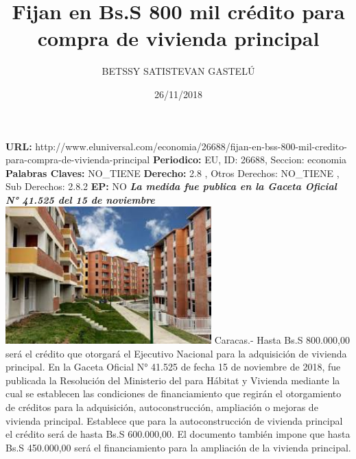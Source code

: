 \documentclass{article}%
\title{\textbf{Fijan en Bs.S 800 mil crédito para compra de vivienda principal}}%
\author{BETSSY SATISTEVAN GASTELÚ}%
\date{26/11/2018}%
\begin{document}
%
\normalsize%
\maketitle%
\textbf{URL: }%
http://www.eluniversal.com/economia/26688/fijan{-}en{-}bss{-}800{-}mil{-}credito{-}para{-}compra{-}de{-}vivienda{-}principal\newline%
%
\textbf{Periodico: }%
EU, %
ID: %
26688, %
Seccion: %
economia\newline%
%
\textbf{Palabras Claves: }%
NO\_TIENE\newline%
%
\textbf{Derecho: }%
2.8%
, Otros Derechos: %
NO\_TIENE%
, Sub Derechos: %
2.8.2%
\newline%
%
\textbf{EP: }%
NO\newline%
\newline%
%
\textbf{\textit{La medida fue publica en la Gaceta Oficial N° 41.525 del 15 de noviembre}}%
\newline%
\newline%
%
\includegraphics[width=300px]{218.jpg}%
\newline%
%
Caracas.{-} Hasta Bs.S 800.000,00 será el  crédito que otorgará el Ejecutivo Nacional para la adquisición de vivienda principal.\newline%
\newline%
En la Gaceta Oficial N° 41.525 de fecha 15 de noviembre de 2018, fue publicada la Resolución del Ministerio del para Hábitat y Vivienda mediante la cual se establecen las condiciones de financiamiento que regirán el otorgamiento de créditos para la adquisición, autoconstrucción, ampliación o mejoras de vivienda principal.\newline%
\newline%
Establece que para la autoconstrucción de vivienda principal el crédito será de hasta Bs.S 600.000,00.%
\newline%
%
El documento también impone que hasta Bs.S 450.000,00  será el financiamiento para  la ampliación de la vivienda principal.\newline%
\end{document}
